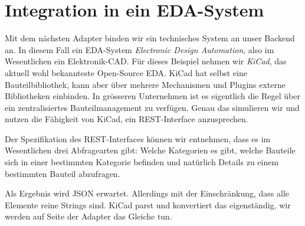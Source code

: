 \section{Integration in ein EDA-System}

Mit dem nächsten Adapter binden wir ein technisches System an unser Backend
an. In diesem Fall ein EDA-System \textit{Electronic Design Automation}, also
im Wesentlichen ein Elektronik-CAD. Für dieses Beispiel nehmen wir 
\textit{KiCad}, das aktuell wohl bekannteste Open-Source EDA. KiCad hat selbst
eine Bauteilbibliothek, kann aber über mehrere Mechanismen und Plugins externe
Bibliotheken einbinden. In grösseren Unternehmen ist es eigentlich die Regel
über ein zentralisiertes Bauteilmanagement zu verfügen. Genau das simulieren
wir und nutzen die Fähigkeit von KiCad, ein REST-Interface anzusprechen.

Der Spezifikation des REST-Interfaces \cite{kicad_http_2026} können wir
entnehmen, dass es im Wesentlichen drei Abfragearten gibt: Welche
Kategorien es gibt, welche Bauteile sich in einer bestimmten Kategorie
befinden und natürlich Details zu einem bestimmten Bauteil abzufragen.

Als Ergebnis wird JSON erwartet. Allerdings mit der Einschränkung, dass alle
Elemente reine Strings sind. KiCad parst und konvertiert das eigenständig,
wir werden auf Seite der Adapter das Gleiche tun.

